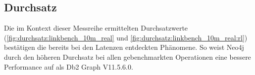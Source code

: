 \begin{table}[!ht]
\centering
{}
\caption{Latenz Linkbench-Real-10M Neo4j getLinkList}
\label{tab:latenz_10m_real:neo4j:gll}
\end{table}

\subsection{Durchsatz}
Die im Kontext dieser Messreihe ermittelten Durchsatzwerte (\autoref{fig:durchsatz:linkbench_10m_real} und \autoref{fig:durchsatz:linkbench_10m_real:rl}) bestätigen die bereits bei den Latenzen entdeckten Phänomene. So weist Neo4j durch den höheren Durchsatz bei allen gebenchmarkten Operationen eine bessere Performance auf als Db2 Graph V11.5.6.0. 

